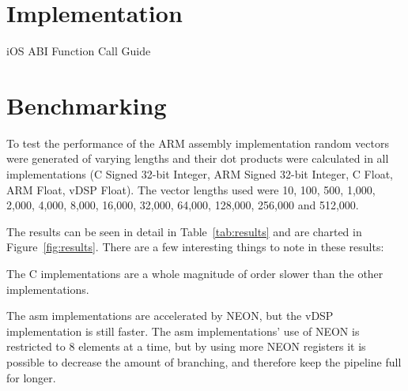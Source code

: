 \documentclass[oneside,a4paper]{report}
\begin{document}
\section{Implementation}
iOS ABI Function Call Guide \cite{iOSABI}

\section{Benchmarking}

To test the performance of the ARM assembly implementation random vectors were generated of varying lengths and their dot products were calculated in all implementations (C Signed 32-bit Integer, ARM Signed 32-bit Integer, C Float, ARM Float, vDSP Float). The vector lengths used were 10, 100, 500, 1,000, 2,000, 4,000, 8,000, 16,000, 32,000, 64,000, 128,000, 256,000 and 512,000.

The results can be seen in detail in Table~\ref{tab:results} and are charted in Figure~\ref{fig:results}. There are a few interesting things to note in these results:
\begin{enumeration}
	\item The C implementations are a whole magnitude of order slower than the other implementations.
	\item The asm implementations are accelerated by NEON, but the vDSP implementation is still faster. The asm implementations' use of NEON is restricted to 8 elements at a time, but by using more NEON registers it is possible to decrease the amount of branching, and therefore keep the pipeline full for longer.
\end{enumeration}
\end{document}
